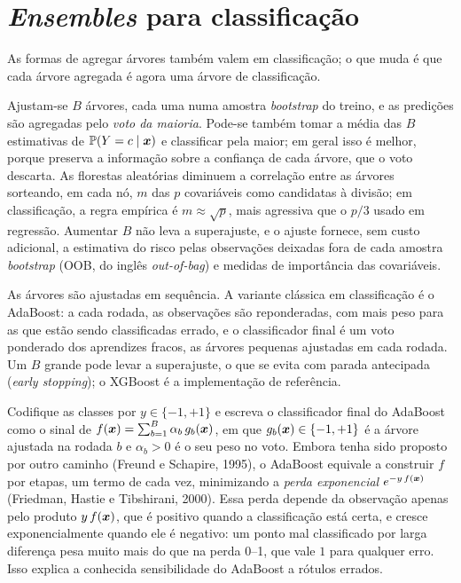 \documentclass[11pt,a4paper]{article}
\begin{document}
\section{\emph{Ensembles} para classificação}
As formas de agregar árvores também valem em classificação; o que muda é que cada
árvore agregada é agora uma árvore de classificação.
\begin{description}[leftmargin=2.6cm,style=nextline]
  \item[Bagging / Florestas] Ajustam-se $B$ árvores, cada uma numa amostra
        \emph{bootstrap} do treino, e as predições são agregadas pelo \emph{voto da
        maioria}. Pode-se também tomar a média das $B$ estimativas de
        $\mathbb{P}(Y=c\mid\bm{x})$ e classificar pela maior; em geral isso é melhor, porque
        preserva a informação sobre a confiança de cada árvore, que o voto descarta.
        As florestas aleatórias diminuem a correlação entre as árvores sorteando, em
        cada nó, $m$ das $p$ covariáveis como candidatas à divisão; em classificação,
        a regra empírica é $m\approx\sqrt{p}$, mais agressiva que o $p/3$ usado em
        regressão. Aumentar $B$ não leva a superajuste, e o ajuste fornece, sem custo
        adicional, a estimativa do risco pelas observações deixadas fora de cada
        amostra \emph{bootstrap} (OOB, do inglês \emph{out-of-bag}) e medidas de
        importância das covariáveis.
  \item[Boosting] As árvores são ajustadas em sequência. A variante clássica em
        classificação é o AdaBoost: a cada rodada, as observações são reponderadas,
        com mais peso para as que estão sendo classificadas errado, e o classificador
        final é um voto ponderado dos aprendizes fracos, as árvores pequenas
        ajustadas em cada rodada. Um $B$ grande pode levar a superajuste, o que se
        evita com parada antecipada (\emph{early stopping}); o XGBoost é a
        implementação de referência.
\end{description}

\begin{observacao}
Codifique as classes por $y\in\{-1,+1\}$ e escreva o classificador final do AdaBoost
como o sinal de $f(\bm{x})=\sum_{b=1}^{B}\alpha_b\,g_b(\bm{x})$, em que $g_b(\bm{x})\in\{-1,+1\}$
é a árvore ajustada na rodada $b$ e $\alpha_b>0$ é o seu peso no voto. Embora tenha
sido proposto por outro caminho (Freund e Schapire, 1995), o AdaBoost equivale a
construir $f$ por etapas, um termo de cada vez, minimizando a \emph{perda
exponencial} $e^{-y\,f(\bm{x})}$ (Friedman, Hastie e Tibshirani, 2000). Essa perda
depende da observação apenas pelo produto $y\,f(\bm{x})$, que é positivo quando a
classificação está certa, e cresce exponencialmente quando ele é negativo: um ponto
mal classificado por larga diferença pesa muito mais do que na perda 0--1, que vale
$1$ para qualquer erro. Isso explica a conhecida sensibilidade do AdaBoost a rótulos
errados.
\end{observacao}
\end{document}
